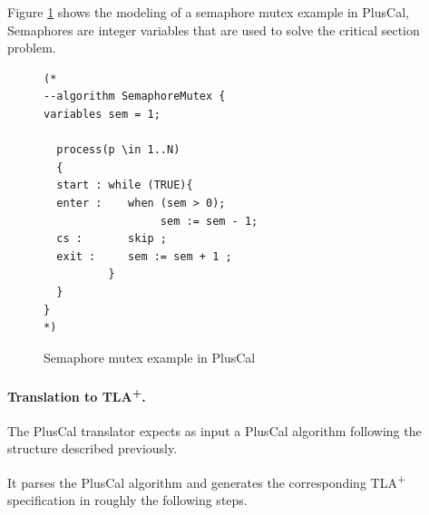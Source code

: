 \documentclass{thesul}
\newcommand{\tlaplus}{TLA\textsuperscript{+}\xspace}
\begin{document}
Figure \ref{semaphoreEx} shows the modeling of a semaphore mutex example in PlusCal, Semaphores are integer variables that are used to solve the critical section problem.

\FloatBarrier 
\begin{figure}
\begin{lstlisting}[frame = tlrb, firstnumber = 1]
(*
--algorithm SemaphoreMutex {
variables sem = 1;

  process(p \in 1..N)
  {
  start : while (TRUE){
  enter :    when (sem > 0);
                  sem := sem - 1;            
  cs :       skip ;
  exit :     sem := sem + 1 ;
          }
  }
}
*)

\end{lstlisting}
\caption{Semaphore mutex example in PlusCal}
\label{semaphoreEx}
\end{figure} 

\paragraph{Translation to \tlaplus.}
The PlusCal translator expects as input a PlusCal algorithm following the structure described previously.

It parses the PlusCal algorithm and generates the corresponding \tlaplus specification in roughly the following steps.
\end{document}
